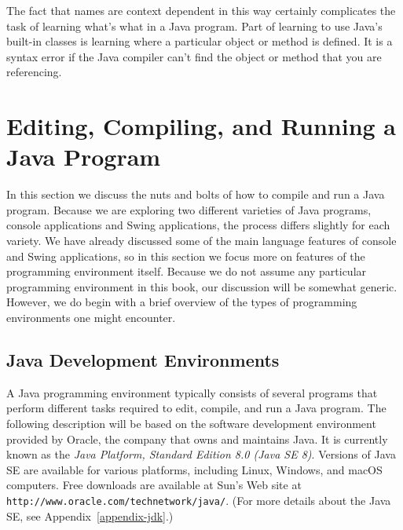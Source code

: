 

\noindent The fact that names are context dependent in this way certainly
complicates the task of learning what's what in a Java program.   Part
of learning to use Java's built-in classes is learning where a
particular object or method is defined.  It is a syntax error if the
Java compiler can't find the object or method that you are
referencing.


\section{Editing, Compiling, and 
Running a Java Program}

\noindent In this section we discuss the nuts and bolts of 
how to compile and run a Java program. Because we are exploring two 
different varieties of Java programs, console applications and Swing
applications, 
the process differs slightly for each variety.  We have already discussed some of the main
language features of console and Swing applications, so in this section
we focus more on features of the programming environment itself.
Because we do not assume any particular programming environment in
this book, our discussion will be somewhat generic.  However,
we do begin with a brief overview of the types of programming
environments one might encounter.

\subsection{Java Development Environments}

\noindent A Java programming environment typically consists of several 
programs that perform different tasks required to edit, compile, and
run a Java program.  The following description will be based on the
software development environment provided by Oracle, the
company that owns and maintains Java. It is currently known as the {\it Java
Platform, Standard Edition 8.0 (Java SE 8)}. Versions of Java SE are
available for various platforms, including Linux, Windows, and
macOS computers.  Free downloads are available at Sun's Web site
at {\tt http://www.oracle.com/technetwork/java/}. (For more details
about the Java SE,
see Appendix~\ref{appendix-jdk}.)

